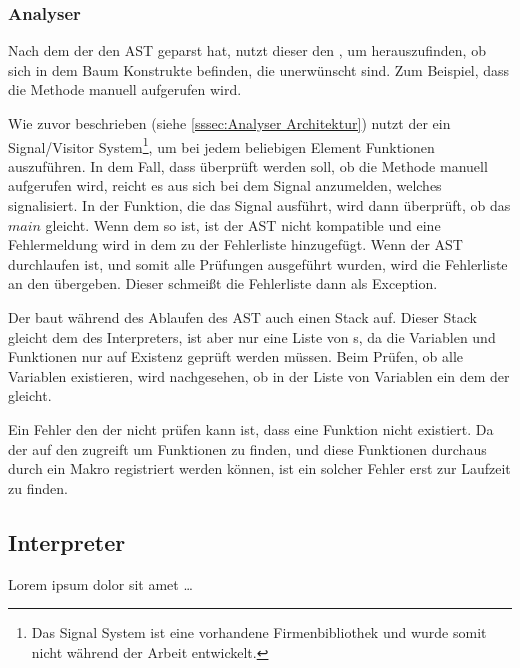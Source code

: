 {    %
    \subsubsection{Analyser}
    \label{sssec:Analyser}
      Nach dem der  den AST geparst hat, nutzt dieser den , um herauszufinden, ob sich in dem Baum Konstrukte befinden, die unerwünscht sind. Zum Beispiel, dass die  Methode manuell aufgerufen wird.

      Wie zuvor beschrieben (siehe \autoref{sssec:Analyser Architektur}) nutzt der  ein Signal/Visitor System\footnote{
        Das Signal System ist eine vorhandene Firmenbibliothek und wurde somit nicht während der Arbeit entwickelt.
      }, um bei jedem beliebigen Element Funktionen auszuführen. In dem Fall, dass überprüft werden soll, ob die  Methode manuell aufgerufen wird, reicht es aus sich bei dem Signal anzumelden, welches  signalisiert. In der Funktion, die das Signal ausführt, wird dann überprüft, ob das  \myRIn$main$ gleicht. Wenn dem so ist, ist der AST nicht kompatible und eine Fehlermeldung wird in dem  zu der Fehlerliste hinzugefügt. Wenn der AST durchlaufen ist, und somit alle Prüfungen ausgeführt wurden, wird die Fehlerliste an den  übergeben. Dieser schmeißt die Fehlerliste dann als Exception.

      Der  baut während des Ablaufen des AST auch einen Stack auf. Dieser Stack gleicht dem des Interpreters, ist aber nur eine Liste von s, da die Variablen und Funktionen nur auf Existenz geprüft werden müssen. Beim Prüfen, ob alle Variablen existieren, wird nachgesehen, ob in der Liste von Variablen ein  dem der  gleicht.

      Ein Fehler den der  nicht prüfen kann ist, dass eine Funktion nicht existiert. Da der  auf den  zugreift um Funktionen zu finden, und diese Funktionen durchaus durch ein Makro registriert werden können, ist ein solcher Fehler erst zur Laufzeit zu finden.

  \subsection{Interpreter}
  \label{ssec:Interpreter}
    Lorem ipsum dolor sit amet \ldots

}
